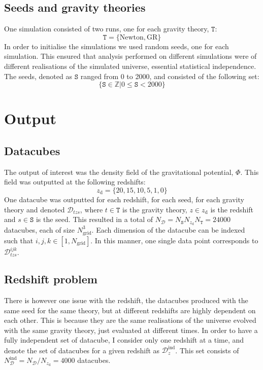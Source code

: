     \subsection{Seeds and gravity theories}
        One simulation consisted of two runs, one for each gravity theory, $\mathtt{T}$:
        \begin{equation}
            \mathtt{T} = \{\mathrm{Newton}, \mathrm{GR}\}
        \end{equation}
        In order to initialise the simulations we used random seeds, one for each simulation. This ensured that analysis performed on different simulations were of different realisations of the simulated universe, essential statistical independence. The seeds, denoted as $\mathtt{S}$ ranged from 0 to 2000, and consisted of the following set:
        \begin{equation}
            \{\mathtt{S} \in \mathbb{Z} | 0 \leq \mathtt{S} < 2000 \}
        \end{equation}

    \section{Output}
    \subsection{Datacubes}
        The output of interest was the density field of the gravitational potential, $\Phi$. This field was outputted at the following redshifts:
        \begin{equation}
            z_\mathrm{d} = \{ 20, 15, 10, 5, 1, 0 \}
        \end{equation}
        One datacube was outputted for each redshift, for each seed, for each gravity theory and denoted $\mathcal{D}_{tzs}$, where $t\in\mathtt{T}$ is the gravity theory, $z\in z_\mathrm{d}$ is the redshift and $s\in\mathtt{S}$ is the seed. This resulted in a total of $N_\mathcal{D}=N_\mathtt{S}N_{z_\mathrm{d}}N_\mathtt{T}=24000$ datacubes, each of size $N_\mathrm{grid}^3$. Each dimension of the datacube can be indexed such that $i,j,k\in[1, N_\mathrm{grid}]$. In this manner, one single data point corresponds to $\mathcal{D}_{tzs}^{ijk}$.

    \subsection{Redshift problem}
        There is however one issue with the redshift, the datacubes produced with the same seed for the same theory, but at different redshifts are highly dependent on each other. This is because they are the same realisations of the universe evolved with the same gravity theory, just evaluated at different times.
        In order to have a fully independent set of datacube, I consider only one redshift at a time, and denote the set of datacubes for a given redshift as $\mathcal{D}_z^\mathrm{ind}$. This set consists of $N_\mathcal{D}^\mathrm{ind}=N_\mathcal{D}/N_{z_\mathrm{d}}=4000$ datacubes.
    

